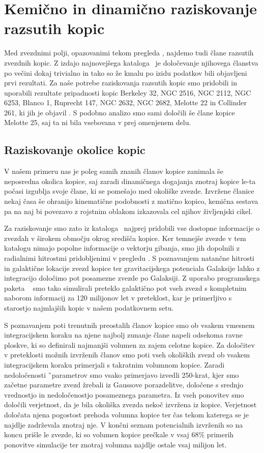 \section{Kemično in dinamično raziskovanje razsutih kopic}
\label{sec:slo_kopice_taziskovanje}
Med zvezdnimi polji, opazovanimi tekom pregleda \Gh, najdemo tudi člane razsutih zvezdnih kopic. Z izdajo najnovejšega kataloga \Gs\ je določevanje njihovega članstva po večini dokaj trivialno in tako so že kmalu po izidu podatkov bili objavljeni prvi rezultati. Za naše potrebe raziskovanja razsutih kopic smo pridobili in uporabili rezultate pripadnosti kopic Berkeley 32, NGC 2516, NGC 2112, NGC 6253, Blanco 1, Ruprecht 147, NGC 2632, NGC 2682,  Melotte 22 in Collinder 261, ki jih je objavil \citet{2018A&A...618A..93C}. S podobno analizo smo sami določili še člane kopice Melotte 25, saj ta ni bila vsebovana v prej omenjenem delu.

\subsection{Raziskovanje okolice kopic}
V našem primeru nas je poleg samih znanih članov kopice zanimala še neposredna okolica kopice, saj zaradi dinamičnega dogajanja znotraj kopice le-ta počasi izgublja svoje člane, ki se pomešajo med okoliške zvezde. Izvržene članice nekaj časa še ohranijo kinematične podobnosti z matično kopico, kemična sestava pa na naj bi povezavo z rojstnim oblakom izkazovala cel njihov življenjski cikel. 

Za raziskovanje smo zato iz kataloga \Gs\ najprej pridobili vse dostopne informacije o zvezdah v širokem območju okrog središča kopice. Ker temnejše zvezde v tem katalogu nimajo popolne informacije o vektorju gibanja, smo jih dopolnili z radialnimi hitrostmi pridobljenimi v pregledu \Gh. S poznavanjem natančne hitrosti in galaktične lokacije zvezd kopice ter gravitacijskega potenciala Galaksije lahko z integracijo določimo pot posamezne zvezde po Galaksiji. Z uporabo programskega paketa \GP\ \cite{2015ApJS..216...29B} smo tako simulirali preteklo galaktično pot vseh zvezd s kompletnim naborom informacij za 120 milijonov let v preteklost, kar je primerljivo s starostjo najmlajših kopic v našem podatkovnem setu.

S poznavanjem poti trenutnih preostalih članov kopice smo ob vsakem vmesnem integracijskem koraku na njene najbolj zunanje člane napeli odsekoma ravne ploskve, ki so definirali najmanjši volumen za zajem celotne kopice. Za določitev v preteklosti možnih izvrženih članov smo poti vseh okoliških zvezd ob vsakem integracijskem koraku primerjali s takratnim volumnom kopice. Zaradi nedoločenosti \G\ parametrov smo vsako primerjavo izvedli 250-krat, kjer smo začetne parametre zvezd žrebali iz Gaussove porazdelitve, določene s srednjo vrednostjo in nedoločenostjo posameznega parametra. Iz vseh ponovitev smo določili verjetnost, da je bila okoliška zvezda nekoč izvržena iz kopice. Verjetnost določata njena pogostost prehoda volumna kopice ter čas tekom katerega se je najdlje zadrževala znotraj nje. V končni seznam potencialnih izvrženih so na koncu prišle le zvezde, ki so volumen kopice prečkale v vsaj $68$\% primerih ponovitve simulacije ter znotraj volumna najdlje ostale vsaj milijon let.

